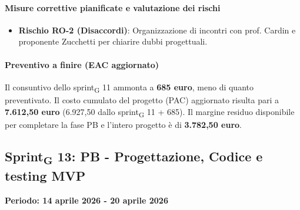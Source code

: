 \documentclass[11pt,a4paper]{article}
\newcommand{\gls}[1]{#1\textsubscript{G}}
\begin{document}
\paragraph{Misure correttive pianificate e valutazione dei rischi}
\begin{itemize}
    \item \textbf{Rischio RO-2 (Disaccordi)}: Organizzazione di incontri con prof. Cardin e proponente Zucchetti per chiarire dubbi progettuali.
\end{itemize}

\paragraph{Preventivo a finire (EAC aggiornato)}
Il consuntivo dello \gls{sprint} 11 ammonta a \textbf{685 euro}, meno di quanto preventivato.
Il costo cumulato del progetto (PAC) aggiornato risulta pari a \textbf{7.612,50 euro} (6.927,50 dallo \gls{sprint} 11 + 685). 
Il margine residuo disponibile per completare la fase PB e l'intero progetto è di \textbf{3.782,50 euro}.



\newpage


\subsection{\gls{Sprint} 13: PB - Progettazione, Codice e testing MVP}
{\textbf{Periodo: 14 aprile 2026 - 20 aprile 2026}\par}
\end{document}

